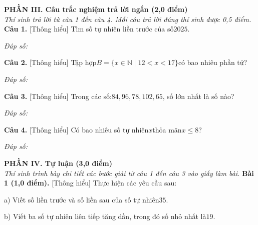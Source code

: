 \documentclass[11pt,a4paper]{article}
\begin{document}
\vspace{6pt}
\noindent
\textbf{\large PHẦN III. Câu trắc nghiệm trả lời ngắn (2,0 điểm)}\\
\textit{\small Thí sinh trả lời từ câu 1 đến câu 4. Mỗi câu trả lời đúng thí sinh được 0,5 điểm.}
\vspace{6pt}
\noindent\textbf{Câu 1.} [Thông hiểu] Tìm số tự nhiên liền trước của số$2025$.\par\vspace{2pt}
\noindent\textit{Đáp số:} \dotfill\par\vspace{6pt}

\noindent\textbf{Câu 2.} [Thông hiểu] Tập hợp$B = \{x \in \mathbb{N} \mid 12 < x < 17\}$có bao nhiêu phần tử?\par\vspace{2pt}
\noindent\textit{Đáp số:} \dotfill\par\vspace{6pt}

\noindent\textbf{Câu 3.} [Thông hiểu] Trong các số:$84, 96, 78, 102, 65$, số lớn nhất là số nào?\par\vspace{2pt}
\noindent\textit{Đáp số:} \dotfill\par\vspace{6pt}

\noindent\textbf{Câu 4.} [Thông hiểu] Có bao nhiêu số tự nhiên$x$thỏa mãn$x \le 8$?\par\vspace{2pt}
\noindent\textit{Đáp số:} \dotfill\par\vspace{6pt}


\vspace{6pt}
\noindent
\textbf{\large PHẦN IV. Tự luận (3,0 điểm)}\\
\textit{\small Thí sinh trình bày chi tiết các bước giải từ câu 1 đến câu 3 vào giấy làm bài.}
\vspace{6pt}
\noindent\textbf{Bài 1 (1,0 điểm).} [Thông hiểu] Thực hiện các yêu cầu sau:\par\noindent a) Viết số liền trước và số liền sau của số tự nhiên$35$.\par\noindent b) Viết ba số tự nhiên liên tiếp tăng dần, trong đó số nhỏ nhất là$19$.\par\vspace{8pt}
\end{document}
